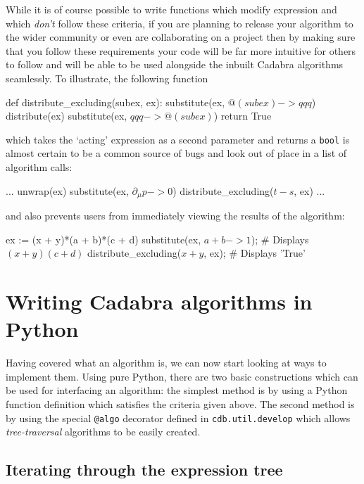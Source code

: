 \documentclass{article}
\begin{document}
While it is of course possible to write functions which modify expression and which \emph{don't} follow these
criteria, if you are planning to release your algorithm to the wider community or even are collaborating on a 
project then by making sure that you follow these requirements your code will be far more intuitive for others to
follow and will be able to be used alongside the inbuilt Cadabra algorithms seamlessly. To illustrate, the 
following function
\begin{lstcdb}
	def distribute_excluding(subex, ex):
		substitute(ex, $@(subex) -> qqq$)
		distribute(ex)
		substitute(ex, $qqq -> @(subex)$)
		return True
\end{lstcdb}
which takes the `acting' expression as a second parameter and returns a \verb|bool| is almost certain to be a common source
of bugs and look out of place in a list of algorithm calls:
\begin{lstcdb}
	...
	unwrap(ex)
	substitute(ex, $\partial_{\mu}{p} -> 0$)
	distribute_excluding($t - s$, ex)
	...
\end{lstcdb}
and also prevents users from immediately viewing the results of the algorithm:
\begin{lstcdb}
	ex := (x + y)*(a + b)*(c + d)
	substitute(ex, $a + b -> 1$); # Displays $(x+y)(c+d)$
	distribute_excluding($x + y$, ex); # Displays 'True'
\end{lstcdb}


\section{Writing Cadabra algorithms in Python}

Having covered what an algorithm is, we can now start looking at ways to implement them. Using pure Python, there
are two basic constructions which can be used for interfacing an algorithm: the simplest method is by using a 
Python function definition which satisfies the criteria given above. The second method is by using the special
\verb|@algo| decorator defined in \verb|cdb.util.develop| which allows \emph{tree-traversal} algorithms to be
easily created.

\subsection{Iterating through the expression tree}
\end{document}
